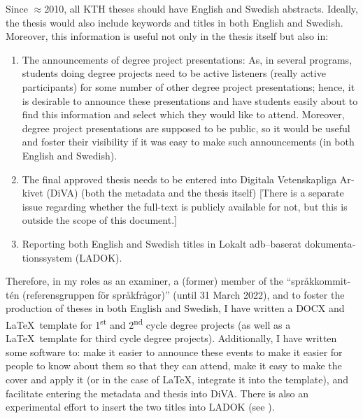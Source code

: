 Since $\approx$2010, all KTH theses should have English and Swedish abstracts. Ideally, the thesis would also include keywords and titles in both English and Swedish. Moreover, this information is useful not only in the thesis itself but also in:
\begin{enumerate}
    \item The announcements of degree project presentations: As, in several programs, students doing degree projects need to be active listeners (really active participants) for some number of other degree project presentations; hence, it is desirable to announce these presentations and have students easily about to find this information and select which they would like to attend. Moreover, degree project presentations are supposed to be public, so it would be useful and foster their visibility if it was easy to make such announcements (in both English and Swedish).
    \item The final approved thesis needs to be entered into \foreignlanguage{swedish}{Digitala Vetenskapliga Arkivet (DiVA)} (both the metadata and the thesis itself) [There is a separate issue regarding whether the full-text is publicly available for not, but this is outside the scope of this document.]
    \item Reporting both English and Swedish titles in \foreignlanguage{swedish}{Lokalt adb–baserat dokumentationssystem (LADOK)}.
\end{enumerate}

Therefore, in my roles as an examiner, a (former) member of the “\foreignlanguage{swedish}{språkkommittén (referensgruppen för språkfrågor})” (until 31 March 2022), and to foster the production of theses in both English and Swedish, I have written a DOCX and \LaTeX~template for 1\textsuperscript{st} and 2\textsuperscript{nd} cycle degree projects (as well as a \LaTeX~template for third cycle degree projects). Additionally, I have written some software to: \first make it easier to announce these events to make it easier for people to know about them so that they can attend, \Second make it easy to make the cover and apply it (or in the case of \LaTeX, integrate it into the template), and \third facilitate entering the metadata and thesis into DiVA. There is also an experimental effort to insert the two titles into LADOK (see ).

